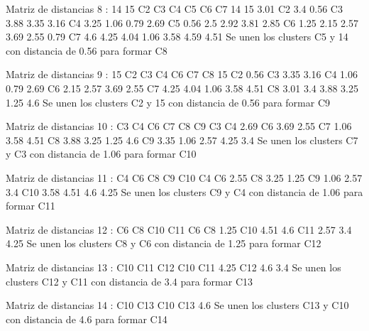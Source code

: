 \documentclass[a4paper, 12pt]{article}
\begin{document}
\begin{itemize}
\begin{Schunk}
\begin{Soutput}
Matriz de distancias 8 :
   14   15   C2   C3   C4   C5   C6   C7
14                                      
15 3.01                                 
C2 3.4  0.56                            
C3 3.88 3.35 3.16                       
C4 3.25 1.06 0.79 2.69                  
C5 0.56 2.5  2.92 3.81 2.85             
C6 1.25 2.15 2.57 3.69 2.55 0.79        
C7 4.6  4.25 4.04 1.06 3.58 4.59 4.51   
Se unen los clusters C5 y 14 con distancia de 0.56 para formar C8 

Matriz de distancias 9 :
   15   C2   C3   C4   C6   C7  C8
15                                
C2 0.56                           
C3 3.35 3.16                      
C4 1.06 0.79 2.69                 
C6 2.15 2.57 3.69 2.55            
C7 4.25 4.04 1.06 3.58 4.51       
C8 3.01 3.4  3.88 3.25 1.25 4.6   
Se unen los clusters C2 y 15 con distancia de 0.56 para formar C9 

Matriz de distancias 10 :
   C3   C4   C6   C7   C8  C9
C3                           
C4 2.69                      
C6 3.69 2.55                 
C7 1.06 3.58 4.51            
C8 3.88 3.25 1.25 4.6        
C9 3.35 1.06 2.57 4.25 3.4   
Se unen los clusters C7 y C3 con distancia de 1.06 para formar C10 

Matriz de distancias 11 :
    C4   C6   C8  C9   C10
C4                        
C6  2.55                  
C8  3.25 1.25             
C9  1.06 2.57 3.4         
C10 3.58 4.51 4.6 4.25    
Se unen los clusters C9 y C4 con distancia de 1.06 para formar C11 

Matriz de distancias 12 :
    C6   C8  C10  C11
C6                   
C8  1.25             
C10 4.51 4.6         
C11 2.57 3.4 4.25    
Se unen los clusters C8 y C6 con distancia de 1.25 para formar C12 

Matriz de distancias 13 :
    C10  C11 C12
C10             
C11 4.25        
C12 4.6  3.4    
Se unen los clusters C12 y C11 con distancia de 3.4 para formar C13 

Matriz de distancias 14 :
    C10 C13
C10        
C13 4.6    
Se unen los clusters C13 y C10 con distancia de 4.6 para formar C14 


\end{Soutput}
\end{Schunk}
\end{itemize}
\end{document}
